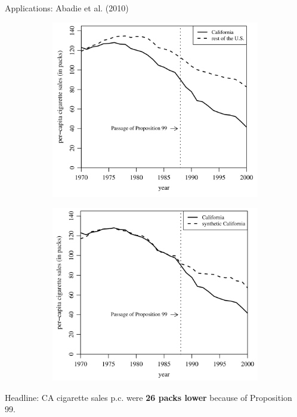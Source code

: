 \documentclass[notes,11pt, aspectratio=169]{beamer}
\begin{document}
\begin{frame}{Applications: Abadie et al. (2010)}
    
    \begin{figure}
        \centering
        \begin{subfigure}{.45 \textwidth}
            \includegraphics[width = \linewidth]{figures/ca_row.png}
        \end{subfigure} 
        \begin{subfigure}{.45 \textwidth}
            \includegraphics[width = \linewidth]{figures/ca_synthca.png}
        \end{subfigure}
    \end{figure}
    
    Headline: CA cigarette sales p.c. were \textbf{26 packs lower} because of Proposition 99. 
    
\end{frame}
\end{document}

